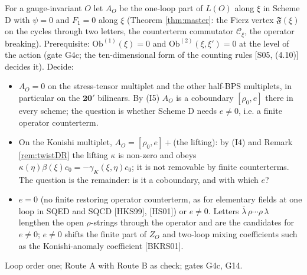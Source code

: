 \begin{problem}
\label{q:Q1}
For a gauge-invariant $O$ let $A_O$ be the one-loop part of $L(O)$ along $\xi$ in Scheme D with $\psi=0$ and $F_1=0$ along $\xi$ (Theorem \ref{thm:master}: the Fierz vertex $\mathfrak F(\xi)$ on the cycles through two letters, the counterterm commutator $\mathcal C_\xi$, the operator breaking). Prerequisite: $\mathrm{Ob}^{(1)}(\xi)=0$ and $\mathrm{Ob}^{(2)}(\xi,\xi')=0$ at the level of the action (gate G4c; the ten-dimensional form of the counting rules [S05, (4.10)] decides it). Decide:
\begin{itemize}
\item[(a)] $A_O=0$ on the stress-tensor multiplet and the other half-BPS multiplets, in particular on the $\mathbf{20}'$ bilinears. By (I5) $A_O$ is a coboundary $[\rho_0,e]$ there in every scheme; the question is whether Scheme D needs $e\neq0$, i.e. a finite operator counterterm.
\item[(b)] On the Konishi multiplet, $A_O=[\rho_0,e]+$(the lifting): by (I4) and Remark \ref{rem:twistDR} the lifting $\kappa$ is non-zero and obeys $\kappa(\eta)\beta(\xi)c_0=-\gamma_K(\xi,\eta)c_0$; it is not removable by finite counterterms. The question is the remainder: is it a coboundary, and with which $e$?
\item[(c)] $e=0$ (no finite restoring operator counterterm, as for elementary fields at one loop in SQED and SQCD [HKS99], [HS01]) or $e\neq0$. Letters $\bar\lambda\,\rho\cdots\rho\,\lambda$ lengthen the open $\rho$-strings through the operator and are the candidates for $e\neq0$; $e\neq0$ shifts the finite part of $Z_O$ and two-loop mixing coefficients such as the Konishi-anomaly coefficient [BKRS01].
\end{itemize}
Loop order one; Route A with Route B as check; gates G4c, G14.
\end{problem}

